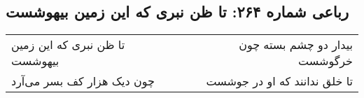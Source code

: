 \begin{center}
\section*{رباعی شماره ۲۶۴: تا ظن نبری که این زمین بیهوشست}
\label{sec:0264}
\begin{longtable}{l p{0.5cm} r}
تا ظن نبری که این زمین بیهوشست
&&
بیدار دو چشم بسته چون خرگوشست
\\
چون دیک هزار کف بسر می‌آرد
&&
تا خلق ندانند که او در جوشست
\\
\end{longtable}
\end{center}
